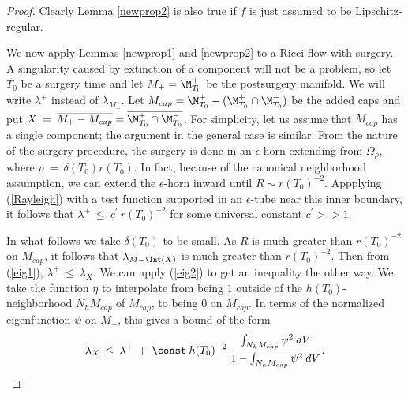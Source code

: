 \begin{proof}

Clearly Lemma \ref{newprop2} is also true if
$f$ is just assumed to be Lipschitz-regular.

We now apply Lemmas \ref{newprop1} and \ref{newprop2}
to a Ricci flow with surgery.
A singularity caused by extinction of a component will not be a
problem, so
let $T_0$ be a surgery time  and let
$M_+ = \M_{T_0}^+$ be the postsurgery manifold.  We will write
$\lambda^+$ instead of $\lambda_{M_+}$. Let $M_{cap} =
\M_{T_0}^+ - (\M_{T_0}^+ \cap \M_{T_0}^-)$ be the added
caps and put $X \: = \: \overline{M_+ - M_{cap}} =
\overline{\M_{T_0}^+ \cap \M_{T_0}^-}$.
For simplicity,
let us assume that $M_{cap}$ has a single component; the argument in
the general case is similar.
From the nature of the surgery procedure, the surgery is done in an
$\epsilon$-horn extending from $\Omega_\rho$, where
$\rho \: = \: \delta(T_0) r(T_0)$.
In fact, because of the canonical
neighborhood assumption, we can extend the $\epsilon$-horn inward
until $R \sim r(T_0)^{-2}$. Appplying (\ref{Rayleigh}) with a test function
supported in an $\epsilon$-tube near this inner boundary, it follows that
$\lambda^+ \: \le \: c^\prime \: r(T_0)^{-2}$ for some universal constant
$c^\prime >> 1$.


In what follows we take $\delta(T_0)$ to be small.
As $R$ is much greater than $r(T_0)^{-2}$ on $M_{cap}$, it follows that
$\lambda_{M - \Int(X)}$ is much greater than $r(T_0)^{-2}$. Then from
(\ref{eig1}), $\lambda^+ \: \le \: \lambda_X$. We can apply
(\ref{eig2}) to get an inequality the other way.
We take the function $\eta$ to interpolate from being $1$ outside of the
$h(T_0)$-neighborhood
$N_h M_{cap}$ of $M_{cap}$, to being $0$ on $M_{cap}$.
In terms of the normalized eigenfunction $\psi$ on $M_+$,
this gives a bound of the form
\begin{equation} \label{bound11}
\lambda_X \: \le \: \lambda^+ \: + \: \const \: h(T_0)^{-2} \:
\frac{\int_{N_h M_{cap}} \psi^2 \: dV}{1 - \int_{N_h M_{cap}} \psi^2 \: dV}.
\end{equation}


\end{proof}
